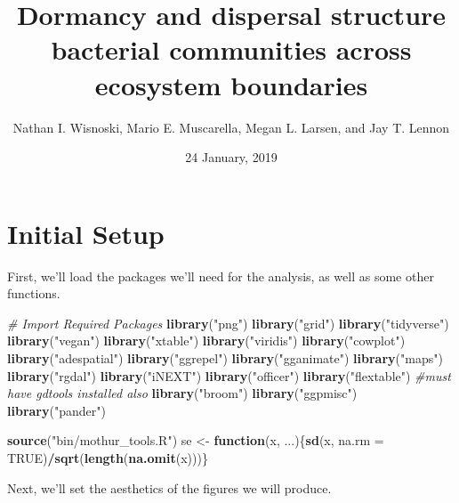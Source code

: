 \documentclass[]{article}
\title{Dormancy and dispersal structure bacterial communities across ecosystem
boundaries}
\author{Nathan I. Wisnoski, Mario E. Muscarella, Megan L. Larsen, and Jay T.
Lennon}
\date{24 January, 2019}
\newenvironment{Shaded}{\begin{snugshade}}{\end{snugshade}}
\newcommand{\KeywordTok}[1]{\textcolor[rgb]{0.13,0.29,0.53}{\textbf{#1}}}
\newcommand{\DataTypeTok}[1]{\textcolor[rgb]{0.13,0.29,0.53}{#1}}
\newcommand{\StringTok}[1]{\textcolor[rgb]{0.31,0.60,0.02}{#1}}
\newcommand{\CommentTok}[1]{\textcolor[rgb]{0.56,0.35,0.01}{\textit{#1}}}
\newcommand{\OtherTok}[1]{\textcolor[rgb]{0.56,0.35,0.01}{#1}}
\newcommand{\ControlFlowTok}[1]{\textcolor[rgb]{0.13,0.29,0.53}{\textbf{#1}}}
\newcommand{\OperatorTok}[1]{\textcolor[rgb]{0.81,0.36,0.00}{\textbf{#1}}}
\newcommand{\NormalTok}[1]{#1}
\begin{document}
\maketitle

\section{Initial Setup}\label{initial-setup}

First, we'll load the packages we'll need for the analysis, as well as
some other functions.

\begin{Shaded}
\begin{Highlighting}[]
\CommentTok{# Import Required Packages}
\KeywordTok{library}\NormalTok{(}\StringTok{"png"}\NormalTok{)}
\KeywordTok{library}\NormalTok{(}\StringTok{"grid"}\NormalTok{)}
\KeywordTok{library}\NormalTok{(}\StringTok{"tidyverse"}\NormalTok{)   }
\KeywordTok{library}\NormalTok{(}\StringTok{"vegan"}\NormalTok{)}
\KeywordTok{library}\NormalTok{(}\StringTok{"xtable"}\NormalTok{)}
\KeywordTok{library}\NormalTok{(}\StringTok{"viridis"}\NormalTok{)}
\KeywordTok{library}\NormalTok{(}\StringTok{"cowplot"}\NormalTok{)}
\KeywordTok{library}\NormalTok{(}\StringTok{"adespatial"}\NormalTok{)}
\KeywordTok{library}\NormalTok{(}\StringTok{"ggrepel"}\NormalTok{)}
\KeywordTok{library}\NormalTok{(}\StringTok{"gganimate"}\NormalTok{)}
\KeywordTok{library}\NormalTok{(}\StringTok{"maps"}\NormalTok{)}
\KeywordTok{library}\NormalTok{(}\StringTok{"rgdal"}\NormalTok{)}
\KeywordTok{library}\NormalTok{(}\StringTok{"iNEXT"}\NormalTok{)}
\KeywordTok{library}\NormalTok{(}\StringTok{"officer"}\NormalTok{)}
\KeywordTok{library}\NormalTok{(}\StringTok{"flextable"}\NormalTok{) }\CommentTok{#must have gdtools installed also}
\KeywordTok{library}\NormalTok{(}\StringTok{"broom"}\NormalTok{)}
\KeywordTok{library}\NormalTok{(}\StringTok{"ggpmisc"}\NormalTok{)}
\KeywordTok{library}\NormalTok{(}\StringTok{"pander"}\NormalTok{)}

\KeywordTok{source}\NormalTok{(}\StringTok{"bin/mothur_tools.R"}\NormalTok{)}
\NormalTok{se <-}\StringTok{ }\ControlFlowTok{function}\NormalTok{(x, ...)\{}\KeywordTok{sd}\NormalTok{(x, }\DataTypeTok{na.rm =} \OtherTok{TRUE}\NormalTok{)}\OperatorTok{/}\KeywordTok{sqrt}\NormalTok{(}\KeywordTok{length}\NormalTok{(}\KeywordTok{na.omit}\NormalTok{(x)))\}}
\end{Highlighting}
\end{Shaded}

Next, we'll set the aesthetics of the figures we will produce.
\end{document}
